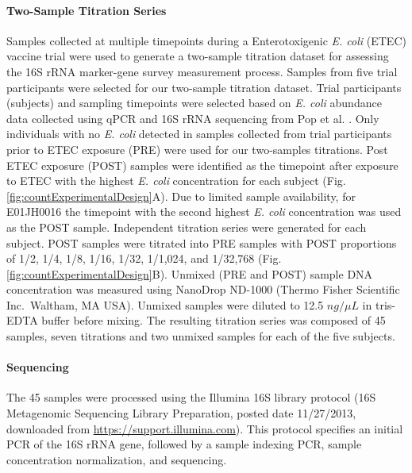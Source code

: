 \documentclass[linenumbers]{bmcart}
\begin{document}
\paragraph*{Two-Sample Titration Series}
Samples collected at multiple timepoints during a Enterotoxigenic
\emph{E. coli} (ETEC) vaccine trial \cite{harro2011refinement} were
used to generate a two-sample titration dataset for assessing the 16S
rRNA marker-gene survey measurement process. Samples from five trial
participants were selected for our two-sample titration dataset. Trial
participants (subjects) and sampling timepoints were selected based on
\emph{E. coli} abundance data collected using qPCR and 16S rRNA
sequencing from Pop et al. \cite{pop2016individual}. Only individuals with no
\emph{E. coli} detected in samples collected from trial participants
prior to ETEC exposure (PRE) were used for our two-samples titrations.
Post ETEC exposure (POST) samples were identified as the timepoint after
exposure to ETEC with the highest \emph{E. coli} concentration for each
subject (Fig. \ref{fig:countExperimentalDesign}A). Due to limited sample
availability, for E01JH0016 the timepoint with the second highest
\emph{E. coli} concentration was used as the POST sample. Independent
titration series were generated for each subject. POST samples
were titrated into PRE samples with POST proportions of 1/2, 1/4, 1/8,
1/16, 1/32, 1/1,024, and 1/32,768 (Fig.
\ref{fig:countExperimentalDesign}B). Unmixed (PRE and POST) sample DNA
concentration was measured using NanoDrop ND-1000 (Thermo Fisher
Scientific Inc.~Waltham, MA USA). Unmixed samples were diluted to 12.5
\(ng/\mu L\) in tris-EDTA buffer before mixing. The resulting titration series was composed of 45 samples, seven titrations and two unmixed samples for each of the five subjects.


\paragraph*{Sequencing}
The 45 samples were processed using the Illumina 16S library protocol
(16S Metagenomic Sequencing Library Preparation, posted date 11/27/2013,
downloaded from \url{https://support.illumina.com}). This protocol
specifies an initial PCR of the 16S rRNA gene, followed by a sample indexing
PCR, sample concentration normalization, and sequencing.
\end{document}
